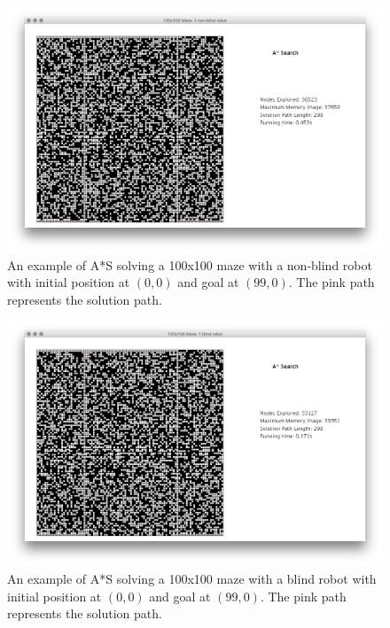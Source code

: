 \documentclass{article}
\begin{document}
\begin{figure}[!htb]
\label{fig:asearch}
\centering
\includegraphics[width=1\linewidth]{./figures/A-maze100x100.png}
\cprotect\caption{An example of A*S solving a 100x100 maze with a non-blind robot with initial position at $(0,0)$ and goal at $(99,0)$. The pink path represents the solution path.}
\end{figure}

\begin{figure}[!htb]
\label{fig:blind}
\centering
\includegraphics[width=1\linewidth]{./figures/A-blind-maze100x100.png}
\cprotect\caption{An example of A*S solving a 100x100 maze with a blind robot with initial position at $(0,0)$ and goal at $(99,0)$. The pink path represents the solution path.}
\end{figure}
\end{document}
